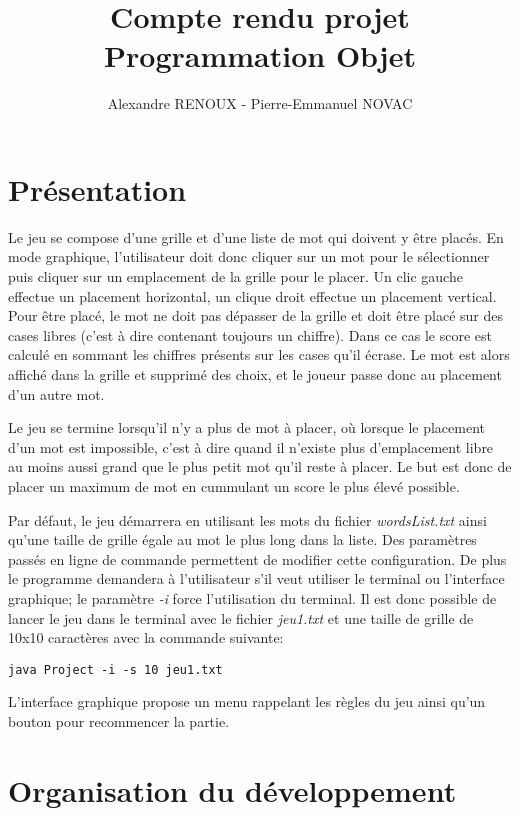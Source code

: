 \documentclass{article}
\title{Compte rendu projet Programmation Objet}
\author{Alexandre RENOUX - Pierre-Emmanuel NOVAC}
\begin{document}
\maketitle

\section{Présentation}

Le jeu se compose d'une grille et d'une liste de mot qui doivent y être placés. En mode graphique, l'utilisateur doit donc cliquer sur un mot pour le sélectionner puis cliquer sur un emplacement de la grille pour le placer. Un clic gauche effectue un placement horizontal, un clique droit effectue un placement vertical. Pour être placé, le mot ne doit pas dépasser de la grille et doit être placé sur des cases libres (c'est à dire contenant toujours un chiffre). Dans ce cas le score est calculé en sommant les chiffres présents sur les cases qu'il écrase. Le mot est alors affiché dans la grille et supprimé des choix, et le joueur passe donc au placement d'un autre mot.

Le jeu se termine lorsqu'il n'y a plus de mot à placer, où lorsque le placement d'un mot est impossible, c'est à dire quand il n'existe plus d'emplacement libre au moins aussi grand que le plus petit mot qu'il reste à placer. Le but est donc de placer un maximum de mot en cummulant un score le plus élevé possible.

Par défaut, le jeu démarrera en utilisant les mots du fichier \textit{wordsList.txt} ainsi qu'une taille de grille égale au mot le plus long dans la liste. Des paramètres passés en ligne de commande permettent de modifier cette configuration. De plus le programme demandera à l'utilisateur s'il veut utiliser le terminal ou l'interface graphique; le paramètre \textit{-i} force l'utilisation du terminal. Il est donc possible de lancer le jeu dans le terminal avec le fichier \textit{jeu1.txt} et une taille de grille de 10x10 caractères avec la commande suivante:
\begin{lstlisting}
java Project -i -s 10 jeu1.txt
\end{lstlisting}

L'interface graphique propose un menu rappelant les règles du jeu ainsi qu'un bouton pour recommencer la partie.

\section{Organisation du développement}
\end{document}
